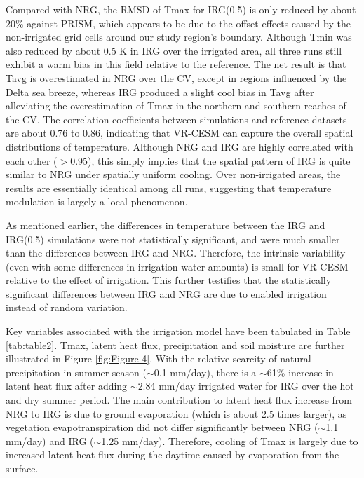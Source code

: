 \documentclass[draft,ms]{agutex}   %
\begin{document}
\begin{article}
Compared with NRG, the RMSD of Tmax for IRG(0.5) is only reduced by about 20$\%$ against PRISM, which appears to be due to the offset effects caused by the non-irrigated grid cells around our study region's boundary. Although Tmin was also reduced by about 0.5 K in IRG over the irrigated area, all three runs still exhibit a warm bias in this field relative to the reference. The net result is that Tavg is overestimated in NRG over the CV, except in regions influenced by the Delta sea breeze, whereas IRG produced a slight cool bias in Tavg after alleviating the overestimation of Tmax in the northern and southern reaches of the CV. The correlation coefficients between simulations and reference datasets are about 0.76 to 0.86, indicating that VR-CESM can capture the overall spatial distributions of temperature. Although NRG and IRG are highly correlated with each other ($>$0.95), this simply implies that the spatial pattern of IRG is quite similar to NRG under spatially uniform cooling. Over non-irrigated areas, the results are essentially identical among all runs, suggesting that temperature modulation is largely a local phenomenon.

As mentioned earlier, the differences {\color{red}in temperature} between the IRG and IRG(0.5) simulations were not statistically significant, and were much smaller than the differences between IRG and NRG. Therefore, the intrinsic variability (even with some differences in irrigation water amounts) is small for VR-CESM relative to the effect of irrigation. This further testifies that the statistically significant differences between IRG and NRG are due to enabled irrigation instead of random variation.


Key variables associated with the irrigation model have been tabulated in Table \ref{tab:table2}. Tmax, latent heat flux, precipitation and soil moisture are further illustrated in Figure \ref{fig:Figure 4}. With the relative scarcity of natural precipitation in summer season ($\sim$0.1 mm/day), there is a $\sim$61\% increase in latent heat flux after adding $\sim$2.84 mm/day irrigated water for IRG over the hot and dry summer period. The main contribution to latent heat flux increase from NRG to IRG is due to ground evaporation (which is about 2.5 times larger), as vegetation evapotranspiration did not differ significantly between NRG ($\sim$1.1 mm/day) and IRG ($\sim$1.25 mm/day). Therefore, cooling of Tmax is largely due to increased latent heat flux during the daytime caused by evaporation from the surface. 


\end{article}
\end{document}
